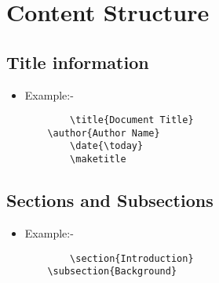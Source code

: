 \section{Content Structure}
\subsection{Title information}
\begin{itemize}
    \item Example:-
    \begin{verbatim}
        \title{Document Title} 
	\author{Author Name} 										
        \date{\today} 											
        \maketitle
    \end{verbatim}
    
\end{itemize}

\subsection{Sections and Subsections}
\begin{itemize}
    \item Example:-
    \begin{verbatim}
        \section{Introduction}
	\subsection{Background}
    \end{verbatim}
    
\end{itemize}


